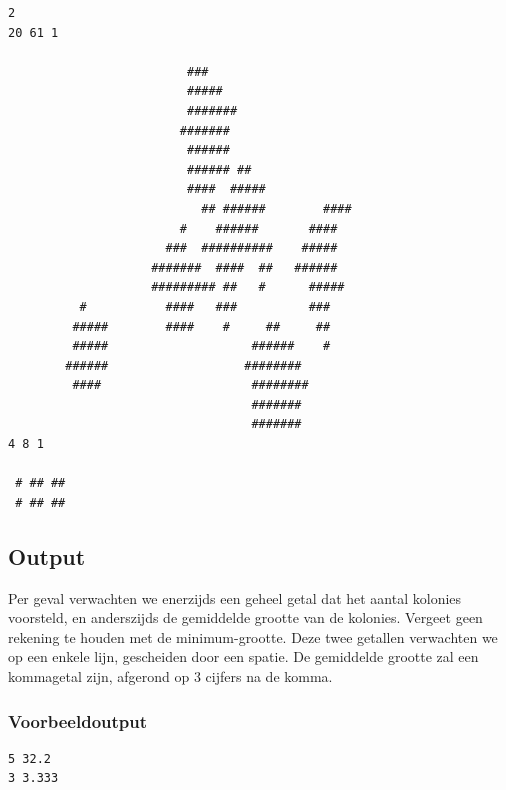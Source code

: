 \begin{verbatim}
2
20 61 1

                         ###
                         #####
                         #######
                        #######
                         ######
                         ###### ##
                         ####  #####
                           ## ######        ####
                        #    ######       ####
                      ###  ##########    #####
                    #######  ####  ##   ######
                    ######### ##   #      #####
          #           ####   ###          ###
         #####        ####    #     ##     ##
         #####                    ######    #
        ######                   ########
         ####                     ########
                                  #######
                                  #######
4 8 1

 # ## ##
 # ## ##

\end{verbatim}

\subsection*{Output}

Per geval verwachten we enerzijds een geheel getal dat het aantal kolonies
voorsteld, en anderszijds de gemiddelde grootte van de kolonies. Vergeet geen
rekening te houden met de minimum-grootte. Deze twee getallen verwachten we op
een enkele lijn, gescheiden door een spatie. De gemiddelde grootte zal een
kommagetal zijn, afgerond op 3 cijfers na de komma.

\subsubsection*{Voorbeeldoutput}

\begin{verbatim}
5 32.2
3 3.333
\end{verbatim}
